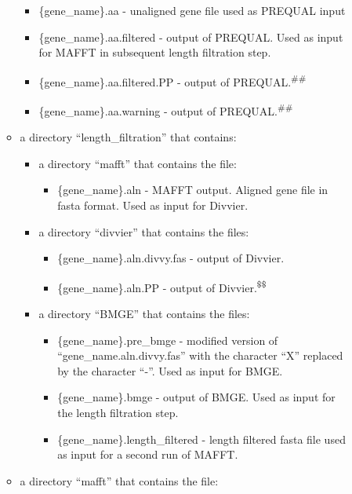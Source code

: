 \documentclass{article}
\begin{document}
\begin{enumerate}[itemsep=12pt]
\begin{description}
\begin{itemize}
\begin{itemize}
                    \item \{gene\_name\}.aa - unaligned gene file used as PREQUAL input
                    \item \{gene\_name\}.aa.filtered - output of PREQUAL. Used as input for MAFFT in subsequent length filtration step.
                    \item \{gene\_name\}.aa.filtered.PP - output of PREQUAL.\textsuperscript{\#\#}
                    \item \{gene\_name\}.aa.warning - output of PREQUAL.\textsuperscript{\#\#}
                \end{itemize}
            \item a directory “length\_filtration” that contains:
            \begin{itemize}
                \item a directory “mafft” that contains the file:
                \begin{itemize}
                    \item \{gene\_name\}.aln - MAFFT output. Aligned gene file in fasta format. Used as input for Divvier.
                \end{itemize}
                \item a directory “divvier” that contains the files:
                \begin{itemize}
                    \item \{gene\_name\}.aln.divvy.fas - output of Divvier.
                    \item \{gene\_name\}.aln.PP - output of Divvier.\textsuperscript{\$\$}
                \end{itemize}
             \item a directory “BMGE” that contains the files:
                \begin{itemize}
                    \item \{gene\_name\}.pre\_bmge -  modified version of “{gene\_name}.aln.divvy.fas” with the character “X” replaced by the character “-”. Used as input for BMGE.
                    \item \{gene\_name\}.bmge - output of BMGE. Used as input for the length filtration step.
                    \item \{gene\_name\}.length\_filtered - length filtered fasta file used as input for a second run of MAFFT.
                \end{itemize}
            \end{itemize}
        \item a directory “mafft” that contains the file:

\end{itemize}
\end{description}
\end{enumerate}
\end{document}
